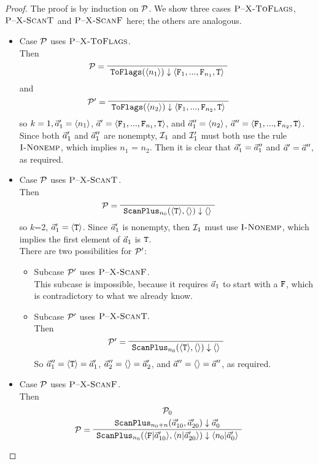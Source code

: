 \begin{proof}
	The proof is by induction on $\mathcal{P}$. We show three cases 
	$\textsc{P--X-ToFlags}$, $\textsc{P--X-ScanT}$ and $\textsc{P--X-ScanF}$ here; the others are analogous.
	\begin{itemize}
		\item Case $\mathcal{P}$ uses $\textsc{P--X-ToFlags}$. \\
		Then
		$$	\PT{\LeLa{\MP =} 
			\Axiom{\blockf{\toflag}{\singl{n_1}}{\< \F_1,...,\F_{n_1},\T \'>}} }
		$$
		and 
		$$	\PT{\LeLa{\MP' =} 
			\Axiom{\blockf{\toflag}{\singl{n_2}}{\< \F_1,...,\F_{n_2},\T \'>}} }
		$$
		so $k=1, \vec a_1' = \langle n_1 \rangle$, $\a' = \< \F_1,...,\F_{n_1},\T \'>$, and  
		$\vec a_1'' = \langle n_2 \rangle$, $\a'' = \< \F_1,...,\F_{n_2},\T \'>$. \\
		Since both $\vec a_1'$ and $\vec a_1''$ are nonempty, $\mathcal{I}_{1}$ and $\mathcal{I}_{1}'$ must both use the rule $\textsc{I-Nonemp}$,
		which implies $n_1$ = $n_2$. 
		Then it is clear that $\vec a_1' = \vec a_1''$ and $\vec a' = \vec a''$, as required. 
		
		\item Case $\mathcal{P}$ uses $\textsc{P--X-ScanT}$. \\
		Then 	
		$$\PT{\LeLa{\MP = } \Axiom{\blockf{\scan_{n_0}}{\oT, \emptyv}{\emptyv}}}$$
		so $k$=2, $\vec a_1' = \langle \mathtt{T} \rangle$. 
		Since $\vec a'_1$ is nonempty, then $\mathcal{I}_{1}$ must use $\textsc{I-Nonemp}$, which implies the first element of $\vec a_1$ is $\mathtt{T}$. \\		
		There are two possibilities for $\mathcal{P}'$:
		\begin{itemize}
			\item Subcase $\mathcal{P}'$ uses $\textsc{P--X-ScanF}$.\\
			This subcase is impossible, because it requires $\vec a_1$ to start with a $\mathtt{F}$, which is contradictory to what we already know.
			
			\item Subcase $\mathcal{P}'$ uses $\textsc{P--X-ScanT}.$ \\
			Then $$\PT{\LeLa{\MP' = } \Axiom{\blockf{\scan_{n_0}}{\oT, \emptyv}{\emptyv}}}$$
			So $\vec a''_1 = \langle \mathtt{T} \rangle = \vec a'_1$, $\vec a''_2 = \langle \rangle = \vec a'_2$, and $\vec a'' = \langle \rangle = \vec a''$, as required. 
			
		\end{itemize}
		
		
		\item Case $\mathcal{P}$ uses $\textsc{P--X-ScanF}$. \\
		Then 
		$$\PT{\UCN{\MP_0}{\blockf{\scan_{n_0+n}}{\a'_{10},\a'_{20}}{\a_0'}}
			\LeLa{\MP = }
			\UC{\blockf{\scan_{n_0}}{\<\F|\a'_{10} \'>, \<n|\a'_{20}\'>}{\<n_0|\a'_0\'>}}
		}$$
	

\end{itemize}
\end{proof}
